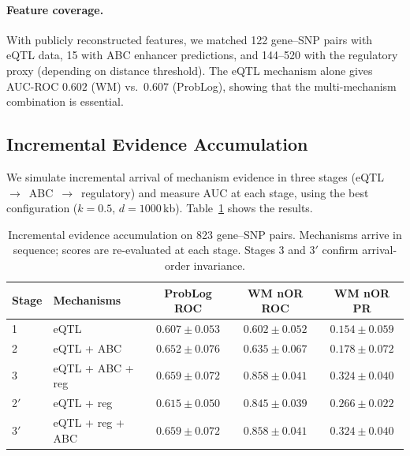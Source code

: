 \documentclass[]{article}
\begin{document}
\paragraph{Feature coverage.}
With publicly reconstructed features, we matched 122 gene--SNP pairs with
eQTL data, 15 with ABC enhancer predictions, and 144--520 with the regulatory
proxy (depending on distance threshold).  The eQTL mechanism alone gives
AUC-ROC $0.602$ (WM) vs.\ $0.607$ (ProbLog), showing that the multi-mechanism
combination is essential.

\subsection{Incremental Evidence Accumulation}
\label{sec:incremental-results}

We simulate incremental arrival of mechanism evidence in three stages
(eQTL~$\to$~ABC~$\to$~regulatory) and measure AUC at each stage,
using the best configuration ($k = 0.5$, $d = 1000$\,kb).
Table~\ref{tab:incremental} shows the results.

\begin{table}[t]
\centering
\caption{Incremental evidence accumulation on 823 gene--SNP pairs.
  Mechanisms arrive in sequence; scores are re-evaluated at each stage.
  Stages 3 and 3$'$ confirm arrival-order invariance.}
\label{tab:incremental}
\begin{tabular}{@{}llccc@{}}
\toprule
\textbf{Stage} & \textbf{Mechanisms} & \textbf{ProbLog ROC} & \textbf{WM nOR ROC} & \textbf{WM nOR PR} \\
\midrule
1  & eQTL             & $0.607 \pm 0.053$ & $0.602 \pm 0.052$ & $0.154 \pm 0.059$ \\
2  & eQTL + ABC       & $0.652 \pm 0.076$ & $0.635 \pm 0.067$ & $0.178 \pm 0.072$ \\
3  & eQTL + ABC + reg & $0.659 \pm 0.072$ & $\mathbf{0.858 \pm 0.041}$ & $\mathbf{0.324 \pm 0.040}$ \\
\midrule
2$'$ & eQTL + reg     & $0.615 \pm 0.050$ & $0.845 \pm 0.039$ & $0.266 \pm 0.022$ \\
3$'$ & eQTL + reg + ABC & $0.659 \pm 0.072$ & $0.858 \pm 0.041$ & $0.324 \pm 0.040$ \\
\bottomrule
\end{tabular}
\end{table}
\end{document}
